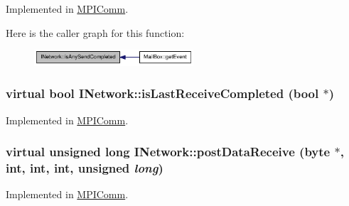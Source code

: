 Implemented in \hyperlink{class_m_p_i_comm_ab56666a8c492a8d53065def42a488d72}{MPIComm}.

Here is the caller graph for this function:\nopagebreak
\begin{figure}[H]
\begin{center}
\leavevmode
\includegraphics[width=168pt]{class_i_network_a4cf6eb047a7d028c3c4c023b59293061_icgraph}
\end{center}
\end{figure}
\hypertarget{class_i_network_af6f98db34182f9ab4d705619eaabde2b}{
\subsubsection[{isLastReceiveCompleted}]{\setlength{\rightskip}{0pt plus 5cm}virtual bool INetwork::isLastReceiveCompleted (bool $\ast$)}}
\label{class_i_network_af6f98db34182f9ab4d705619eaabde2b}


Implemented in \hyperlink{class_m_p_i_comm_a26ebe2409a5fea582918a00896c067e9}{MPIComm}.\hypertarget{class_i_network_aa1b87ec0d7a1f6d6a2956f05afcc3c81}{
\subsubsection[{postDataReceive}]{\setlength{\rightskip}{0pt plus 5cm}virtual unsigned long INetwork::postDataReceive ({\bf byte} $\ast$, \/  int, \/  int, \/  int, \/  unsigned {\em long})}}
\label{class_i_network_aa1b87ec0d7a1f6d6a2956f05afcc3c81}


Implemented in \hyperlink{class_m_p_i_comm_adac7de30f89639b574623e73c16fc0d6}{MPIComm}.

